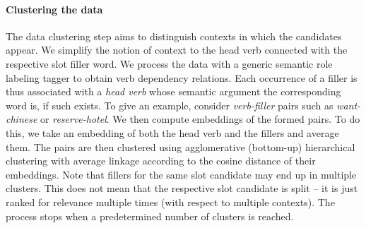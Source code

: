 \paragraph{Clustering the data}
The data clustering step aims to distinguish contexts in which the candidates appear.
We simplify the notion of context to the head verb connected with the respective slot filler word.
We process the data with a generic semantic role labeling tagger to obtain verb dependency relations.
Each occurrence of a filler is thus associated with a \emph{head verb} whose semantic argument the corresponding word is, if such exists. 
To give an example, consider \emph{verb-filler} pairs such as \emph{want-chinese} or \emph{reserve-hotel}.
We then compute embeddings of the formed pairs.
To do this, we take an embedding of both the head verb and the fillers and average them.
The pairs are then clustered using agglomerative (bottom-up) hierarchical clustering with average linkage according to the cosine distance of their embeddings.
Note that fillers for the same slot candidate may end up in multiple clusters.
This does not mean that the respective slot candidate is split -- it is just ranked for relevance multiple times (with respect to multiple contexts).
The process stops when a predetermined number of clusters is reached.

